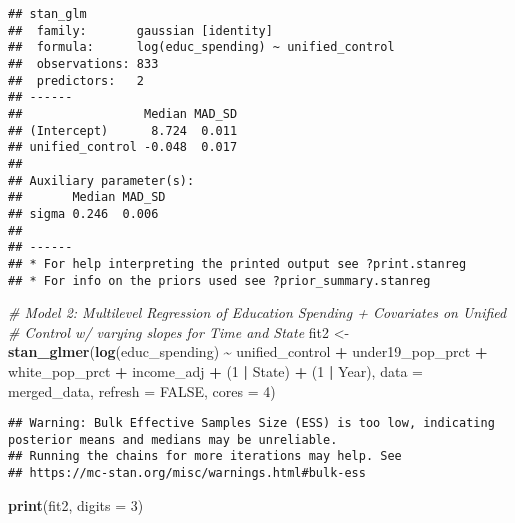 \documentclass[
]{article}
\newenvironment{Shaded}{\begin{snugshade}}{\end{snugshade}}
\newcommand{\AttributeTok}[1]{\textcolor[rgb]{0.13,0.29,0.53}{#1}}
\newcommand{\CommentTok}[1]{\textcolor[rgb]{0.56,0.35,0.01}{\textit{#1}}}
\newcommand{\ConstantTok}[1]{\textcolor[rgb]{0.56,0.35,0.01}{#1}}
\newcommand{\DecValTok}[1]{\textcolor[rgb]{0.00,0.00,0.81}{#1}}
\newcommand{\FunctionTok}[1]{\textcolor[rgb]{0.13,0.29,0.53}{\textbf{#1}}}
\newcommand{\NormalTok}[1]{#1}
\newcommand{\OtherTok}[1]{\textcolor[rgb]{0.56,0.35,0.01}{#1}}
\newcommand{\SpecialCharTok}[1]{\textcolor[rgb]{0.81,0.36,0.00}{\textbf{#1}}}
\begin{document}
\begin{verbatim}
## stan_glm
##  family:       gaussian [identity]
##  formula:      log(educ_spending) ~ unified_control
##  observations: 833
##  predictors:   2
## ------
##                 Median MAD_SD
## (Intercept)      8.724  0.011
## unified_control -0.048  0.017
## 
## Auxiliary parameter(s):
##       Median MAD_SD
## sigma 0.246  0.006 
## 
## ------
## * For help interpreting the printed output see ?print.stanreg
## * For info on the priors used see ?prior_summary.stanreg
\end{verbatim}

\begin{Shaded}
\begin{Highlighting}[]
\CommentTok{\# Model 2: Multilevel Regression of Education Spending + Covariates on Unified }
\CommentTok{\# Control w/ varying slopes for Time and State}
\NormalTok{fit2 }\OtherTok{\textless{}{-}} \FunctionTok{stan\_glmer}\NormalTok{(}\FunctionTok{log}\NormalTok{(educ\_spending) }\SpecialCharTok{\textasciitilde{}}\NormalTok{ unified\_control }\SpecialCharTok{+}
\NormalTok{                     under19\_pop\_prct }\SpecialCharTok{+} 
\NormalTok{                     white\_pop\_prct }\SpecialCharTok{+} 
\NormalTok{                     income\_adj }\SpecialCharTok{+} 
\NormalTok{                     (}\DecValTok{1} \SpecialCharTok{|}\NormalTok{ State) }\SpecialCharTok{+} 
\NormalTok{                     (}\DecValTok{1} \SpecialCharTok{|}\NormalTok{ Year),}
                   \AttributeTok{data =}\NormalTok{ merged\_data,}
                   \AttributeTok{refresh =} \ConstantTok{FALSE}\NormalTok{,}
                   \AttributeTok{cores =} \DecValTok{4}\NormalTok{)}
\end{Highlighting}
\end{Shaded}

\begin{verbatim}
## Warning: Bulk Effective Samples Size (ESS) is too low, indicating posterior means and medians may be unreliable.
## Running the chains for more iterations may help. See
## https://mc-stan.org/misc/warnings.html#bulk-ess
\end{verbatim}

\begin{Shaded}
\begin{Highlighting}[]
\FunctionTok{print}\NormalTok{(fit2, }\AttributeTok{digits =} \DecValTok{3}\NormalTok{)}
\end{Highlighting}
\end{Shaded}
\end{document}
